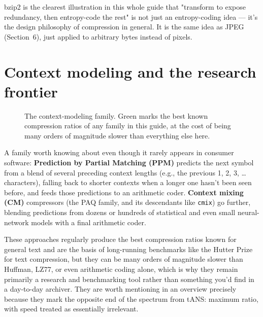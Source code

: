 \documentclass[11pt]{article}
\begin{document}
bzip2 is the clearest illustration in this whole guide that "transform to expose redundancy, then entropy-code the rest" is not just an entropy-coding idea — it's the design philosophy of compression in general. It is the same idea as JPEG (Section~6), just applied to arbitrary bytes instead of pixels.

\section{Context modeling and the research frontier}

\begin{figure}[h]
\centering
{}
\caption{The context-modeling family. Green marks the best known compression ratios of any family in this guide, at the cost of being many orders of magnitude slower than everything else here.}
\end{figure}

A family worth knowing about even though it rarely appears in consumer software: \textbf{Prediction by Partial Matching (PPM)} predicts the next symbol from a blend of several preceding context lengths (e.g., the previous 1, 2, 3, \ldots characters), falling back to shorter contexts when a longer one hasn't been seen before, and feeds those predictions to an arithmetic coder. \textbf{Context mixing (CM)} compressors (the PAQ family, and its descendants like \texttt{cmix}) go further, blending predictions from dozens or hundreds of statistical and even small neural-network models with a final arithmetic coder.

These approaches regularly produce the best compression ratios known for general text and are the basis of long-running benchmarks like the Hutter Prize for text compression, but they can be many orders of magnitude slower than Huffman, LZ77, or even arithmetic coding alone, which is why they remain primarily a research and benchmarking tool rather than something you'd find in a day-to-day archiver. They are worth mentioning in an overview precisely because they mark the opposite end of the spectrum from tANS: maximum ratio, with speed treated as essentially irrelevant.
\end{document}
